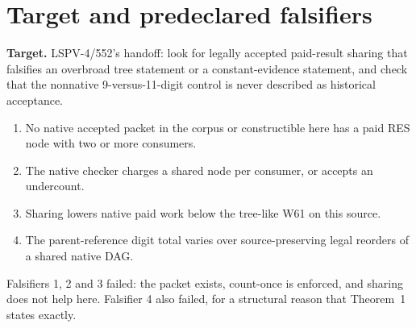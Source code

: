 \documentclass[11pt]{article}
\begin{document}
\section*{Target and predeclared falsifiers}
\textbf{Target.} LSPV-4/552's handoff: look for legally accepted paid-result sharing that
falsifies an overbroad tree statement or a constant-evidence statement, and check that the
nonnative 9-versus-11-digit control is never described as historical acceptance.
\begin{enumerate}
\item No native accepted packet in the corpus or constructible here has a paid RES node with two or more consumers.
\item The native checker charges a shared node per consumer, or accepts an undercount.
\item Sharing lowers native paid work below the tree-like W61 on this source.
\item The parent-reference digit total varies over source-preserving legal reorders of a shared native DAG.
\end{enumerate}
Falsifiers 1, 2 and 3 failed: the packet exists, count-once is enforced, and sharing does
not help here. Falsifier 4 also failed, for a structural reason that Theorem~1 states exactly.
\end{document}
